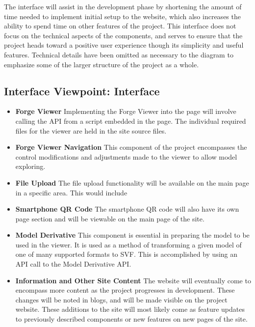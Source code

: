 \documentclass[letterpaper, 10pt, draftclsnofoot, compsoc, onecolumn]{IEEEtran}
\begin{document}
The interface will assist in the development phase by shortening the amount of time needed to implement initial setup to the website, which also increases the ability to spend time on other features of the project. This interface does not focus on the technical aspects of the components, and serves to ensure that the project heads toward a positive user experience though its simplicity and useful features. Technical details have been omitted as necessary to the diagram to emphasize some of the larger structure of the project as a whole. 

\subsection{Interface Viewpoint: Interface}
\begin{itemize}
	 \item[]\textbf{Forge Viewer} Implementing the Forge Viewer into the page will involve calling the API from a script embedded in the page. The individual required files for the viewer are held in the site source files.
	
	\item[]\textbf{Forge Viewer Navigation} This component of the project encompasses the control modifications and adjustments made to the viewer to allow model exploring.
	 
	\item[]\textbf{File Upload} The file upload functionality will be available on the main page in a specific area. This would include 
	
	\item[]\textbf{Smartphone QR Code}  The smartphone QR code will also have its own page section and will be viewable on the main page of the site.
	
	\item[]\textbf{Model Derivative} This component is essential in preparing the model to be used in the viewer. It is used as a method of transforming a given model of one of many supported formats to SVF. This is accomplished by using an API call to the Model Derivative API.
	
	\item[]\textbf{Information and Other Site Content} The website will eventually come to encompass more content as the project progresses in development. These changes will be noted in blogs, and will be made visible on the project website. These additions to the site will most likely come as feature updates to previously described components or new features on new pages of the site.	
\end{itemize}
\end{document}
